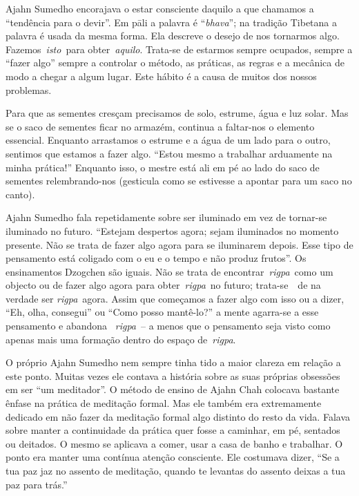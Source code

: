 Ajahn Sumedho encorajava o estar consciente daquilo a que chamamos a
``tendência para o devir''. Em pāli a palavra é ``\emph{bhava}''; na
tradição Tibetana a palavra é usada da mesma forma. Ela descreve o
desejo de nos tornarmos algo. Fazemos~\emph{isto}~para
obter~\emph{aquilo}. Trata-se de estarmos sempre ocupados, sempre a
``fazer algo'' sempre a controlar o método, as práticas, as regras e a
mecânica de modo a chegar a algum lugar. Este hábito é a causa de muitos
dos nossos problemas. ~

Para que as sementes cresçam precisamos de solo, estrume, água e luz
solar. Mas se o saco de sementes ficar no armazém, continua a faltar-nos
o elemento essencial. Enquanto arrastamos o estrume e a água de um lado
para o outro, sentimos que estamos a fazer algo. ``Estou mesmo a
trabalhar arduamente na minha prática!'' Enquanto isso, o mestre está
ali em pé ao lado do saco de sementes relembrando-nos (gesticula como se
estivesse a apontar para um saco no canto).

Ajahn Sumedho fala repetidamente sobre ser iluminado em vez de tornar-se
iluminado no futuro. ``Estejam despertos agora; sejam iluminados no
momento presente. Não se trata de fazer algo agora para se iluminarem
depois. Esse tipo de pensamento está coligado com o eu e o tempo e não
produz frutos''. Os ensinamentos Dzogchen são iguais. Não se trata de
encontrar~\emph{rigpa}~como um objecto ou de fazer algo agora para
obter~\emph{rigpa}~no futuro; trata-se~~de na verdade ser
\emph{rigpa}~agora. Assim que começamos a fazer algo com isso ou a
dizer, ``Eh, olha, consegui'' ou ``Como posso mantê-lo?'' a mente
agarra-se a esse pensamento e abandona~ \emph{rigpa}~-- a menos que o
pensamento seja visto como apenas mais uma formação dentro do espaço
de~\emph{rigpa}.

O próprio Ajahn Sumedho nem sempre tinha tido a maior clareza em relação
a este ponto. Muitas vezes ele contava a história sobre as suas próprias
obsessões em ser ``um meditador''. O método de ensino de Ajahn Chah
colocava bastante ênfase na prática de meditação formal. Mas ele também
era extremamente dedicado em não fazer da meditação formal algo distinto
do resto da vida. Falava sobre manter a continuidade da prática quer
fosse a caminhar, em pé, sentados ou deitados. O mesmo se aplicava a
comer, usar a casa de banho e trabalhar. O ponto era manter uma contínua
atenção consciente. \protect\hypertarget{R2}{}{}Ele costumava dizer,
``Se a tua paz jaz no assento de meditação, quando te levantas do
assento deixas a tua paz para trás.''

